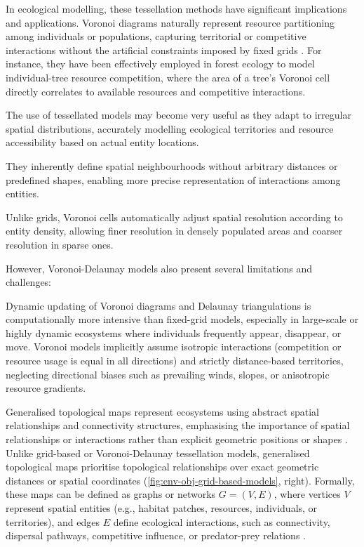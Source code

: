 In ecological modelling, these tessellation methods have significant implications and applications. Voronoi diagrams naturally represent resource partitioning among individuals or populations, capturing territorial or competitive interactions without the artificial constraints imposed by fixed grids \cite{Castle2006}. For instance, they have been effectively employed in forest ecology to model individual-tree resource competition, where the area of a tree's Voronoi cell directly correlates to available resources and competitive interactions.

The use of tessellated models may become very useful as they adapt to irregular spatial distributions, accurately modelling ecological territories and resource accessibility based on actual entity locations.

They inherently define spatial neighbourhoods without arbitrary distances or predefined shapes, enabling more precise representation of interactions among entities.

Unlike grids, Voronoi cells automatically adjust spatial resolution according to entity density, allowing finer resolution in densely populated areas and coarser resolution in sparse ones.

However, Voronoi-Delaunay models also present several limitations and challenges:
\begin{Itemize}
\Item{} Dynamic updating of Voronoi diagrams and Delaunay triangulations is computationally more intensive than fixed-grid models, especially in large-scale or highly dynamic ecosystems where individuals frequently appear, disappear, or move.
\Item{} Voronoi models implicitly assume isotropic interactions (competition or resource usage is equal in all directions) and strictly distance-based territories, neglecting directional biases such as prevailing winds, slopes, or anisotropic resource gradients.
\end{Itemize}


Generalised topological maps represent ecosystems using abstract spatial relationships and connectivity structures, emphasising the importance of spatial relationships or interactions rather than explicit geometric positions or shapes \cite{Urban2009}. Unlike grid-based or Voronoi-Delaunay tessellation models, generalised topological maps prioritise topological relationships over exact geometric distances or spatial coordinates (\cref{fig:env-obj-grid-based-models}, right). Formally, these maps can be defined as graphs or networks $G = (V, E)$, where vertices $V$ represent spatial entities (e.g., habitat patches, resources, individuals, or territories), and edges $E$ define ecological interactions, such as connectivity, dispersal pathways, competitive influence, or predator-prey relations \cite{Hamonic2021,Minor2008,Peterson2024}.

